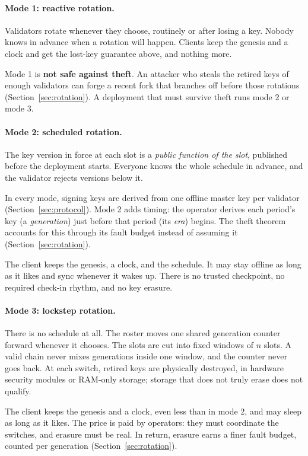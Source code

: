 \documentclass[10pt]{article}
\begin{document}
\paragraph{Mode 1: reactive rotation.}
Validators rotate whenever they choose, routinely or after losing a key.
Nobody knows in advance when a rotation will happen. Clients keep the
genesis and a clock and get the lost-key guarantee above, and nothing
more.

Mode 1 is \textbf{not safe against theft}. An attacker who steals the
retired keys of enough validators can forge a recent fork that branches
off before those rotations (Section~\ref{sec:rotation}). A deployment
that must survive theft runs mode 2 or mode 3.

\paragraph{Mode 2: scheduled rotation.}
The key version in force at each slot is a \emph{public function of the
slot}, published before the deployment starts. Everyone knows the whole
schedule in advance, and the validator rejects versions below it.

In every mode, signing keys are derived from one offline master key per
validator (Section~\ref{sec:protocol}). Mode 2 adds timing: the operator
derives each period's key (a \emph{generation}) just before that period
(its \emph{era}) begins. The theft theorem accounts for this through its
fault budget instead of assuming it (Section~\ref{sec:rotation}).

The client keeps the genesis, a clock, and the schedule. It may stay
offline as long as it likes and sync whenever it wakes up. There is no
trusted checkpoint, no required check-in rhythm, and no key erasure.

\paragraph{Mode 3: lockstep rotation.}
There is no schedule at all. The roster moves one shared generation
counter forward whenever it chooses. The slots are cut into fixed
windows of $n$ slots. A valid chain never mixes generations inside one
window, and the counter never goes back. At each switch, retired keys
are physically destroyed, in hardware security modules or RAM-only
storage; storage that does not truly erase does not qualify.

The client keeps the genesis and a clock, even less than in mode 2, and
may sleep as long as it likes. The price is paid by operators: they must
coordinate the switches, and erasure must be real. In return, erasure
earns a finer fault budget, counted per generation
(Section~\ref{sec:rotation}).
\end{document}
